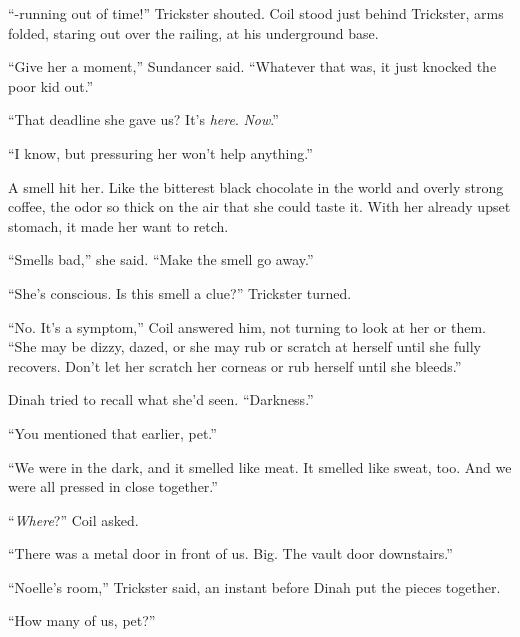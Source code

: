 ``-running out of time!'' Trickster shouted.  Coil stood just behind Trickster, arms folded, staring out over the railing, at his underground base.



``Give her a moment,'' Sundancer said.  ``Whatever that was, it just knocked the poor kid out.''



``That deadline she gave us?  It's \emph{here}.  \emph{Now}.''



``I know, but pressuring her won't help anything.''



A smell hit her.  Like the bitterest black chocolate in the world and overly strong coffee, the odor so thick on the air that she could taste it.  With her already upset stomach, it made her want to retch.



``Smells bad,'' she said.  ``Make the smell go away.''



``She's conscious.  Is this smell a clue?'' Trickster turned.



``No.  It's a symptom,'' Coil answered him, not turning to look at her or them.  ``She may be dizzy, dazed, or she may rub or scratch at herself until she fully recovers.  Don't let her scratch her corneas or rub herself until she bleeds.''



Dinah tried to recall what she'd seen.  ``Darkness.''



``You mentioned that earlier, pet.''



``We were in the dark, and it smelled like meat.  It smelled like sweat, too.  And we were all pressed in close together.''



``\emph{Where}?'' Coil asked.



``There was a metal door in front of us.  Big.  The vault door downstairs.''



``Noelle's room,'' Trickster said, an instant before Dinah put the pieces together.



``How many of us, pet?''



